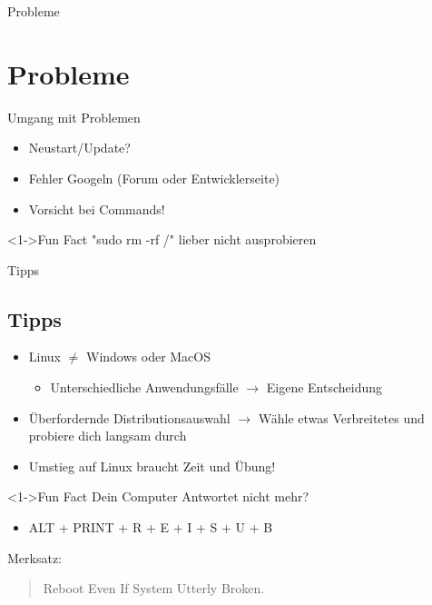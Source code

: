 
\begin{frame}{Probleme}
    \section{Probleme}\label{sec:probleme}

\end{frame}

\begin{frame}{Umgang mit Problemen}

    \begin{itemize}
        \item<3-> Neustart/Update?
        \item<4-> Fehler Googeln (Forum oder Entwicklerseite)
        \item<5-> Vorsicht bei Commands!
    \end{itemize}

    \vspace{0.5cm}
    \begin{exampleblock}<1->{Fun Fact}
        "sudo rm -rf /" lieber nicht ausprobieren
    \end{exampleblock}

\end{frame}

\begin{frame}{Tipps}
    \subsection{Tipps}\label{subsec:tipps}

    \begin{itemize}
        \item<2-> Linux $\neq$ Windows oder MacOS
        \begin{itemize}
            \item <3-> Unterschiedliche Anwendungsfälle $\longrightarrow$ Eigene Entscheidung
        \end{itemize}
        \item<4-> Überfordernde Distributionsauswahl $\longrightarrow$ Wähle etwas Verbreitetes und probiere dich langsam durch
        \item<5-> Umstieg auf Linux braucht Zeit und Übung!
    \end{itemize}

    \vspace{0.5cm}
    \begin{exampleblock}<1->{Fun Fact}
        Dein Computer Antwortet nicht mehr?
        \begin{itemize}
            \item ALT + PRINT + R + E + I + S + U + B
        \end{itemize}
        Merksatz:
        \begin{quote}
            Reboot Even If System Utterly Broken.
        \end{quote}
    \end{exampleblock}

\end{frame}
